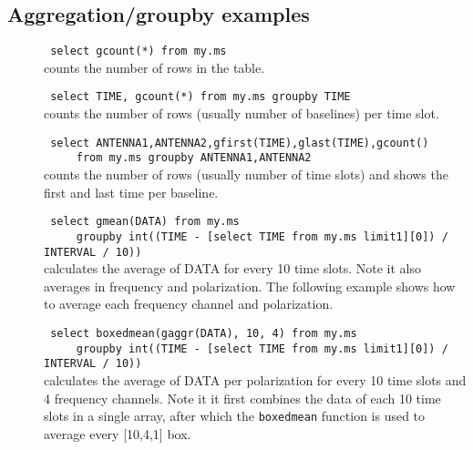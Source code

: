 \subsection{\label{TAQL:AGGREXAMPLES}Aggregation/groupby examples}
\begin{description}
  \item[] \texttt{ select gcount(*) from my.ms }
      \\counts the number of rows in the table.

  \item[] \texttt{ select TIME, gcount(*) from my.ms groupby TIME }
      \\counts the number of rows (usually number of baselines) per time slot.

  \item[] \texttt{ select ANTENNA1,ANTENNA2,gfirst(TIME),glast(TIME),gcount() }
     \\\verb=    =
     \texttt{ from my.ms groupby ANTENNA1,ANTENNA2 }
      \\counts the number of rows (usually number of time slots) and
      shows the first and last time per baseline.

  \item[] \texttt{ select gmean(DATA) from my.ms }
     \\\verb=    =
     \texttt{ groupby int((TIME - [select TIME from my.ms limit1][0]) / INTERVAL / 10)) }
      \\ calculates the average of DATA for every 10 time slots. Note it
      also averages in frequency and polarization. The following example
      shows how to average each frequency channel and polarization.

  \item[] \texttt{ select boxedmean(gaggr(DATA), 10, 4) from my.ms }
     \\\verb=    =
     \texttt{ groupby int((TIME - [select TIME from my.ms limit1][0]) / INTERVAL / 10)) }
      \\ calculates the average of DATA per polarization for every 10
      time slots and 4 frequency channels. Note it it first combines
      the data of each 10 time slots in a single array, after which
      the \texttt{boxedmean} function is used to average every
      [10,4,1] box.
\end{description}


